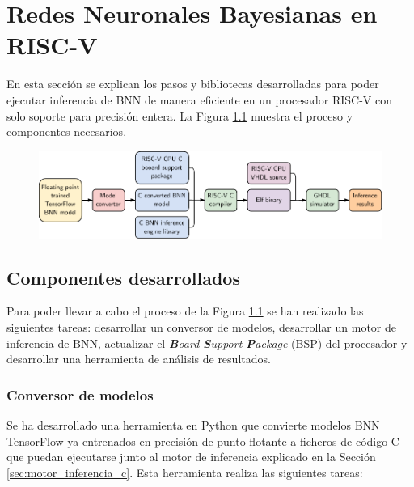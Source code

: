 \chapter{Redes Neuronales Bayesianas en RISC-V}

En esta sección se explican los pasos y bibliotecas desarrolladas para poder ejecutar inferencia de BNN de manera eficiente en un procesador RISC-V con solo soporte para precisión entera. La Figura \ref{fig:experiment_pipeline} muestra el proceso y componentes necesarios.

\begin{figure}[h]
    \centering
    \includegraphics[width=\textwidth]{Imagenes/experiment_pipeline.pdf}
    \caption{\todo}
    \label{fig:experiment_pipeline}
\end{figure}

\section{Componentes desarrollados}

Para poder llevar a cabo el proceso de la Figura \ref{fig:experiment_pipeline} se han realizado las siguientes tareas: desarrollar un conversor de modelos, desarrollar un motor de inferencia de BNN, actualizar el \textit{\textbf{B}oard \textbf{S}upport \textbf{P}ackage} (BSP) del procesador y desarrollar una herramienta de análisis de resultados.

\subsection{Conversor de modelos}

Se ha desarrollado una herramienta en Python que convierte modelos BNN TensorFlow ya entrenados en precisión de punto flotante a ficheros de código C que puedan ejecutarse junto al motor de inferencia explicado en la Sección \ref{sec:motor_inferencia_c}. Esta herramienta realiza las siguientes tareas:


